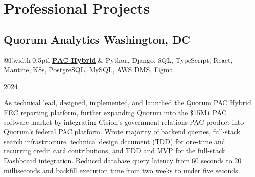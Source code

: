 \documentclass[]{article}
\newcommand\VRule{\color{lightgray}\vrule width 0.5pt}
\def\Plus{\texttt{+}}
\begin{document}


\section*{Professional Projects}
\subsection*{Quorum Analytics \hfill \textnormal{Washington, DC}}


\begin{tabular}{@{}l!{\VRule}l}
	{\bf \href{https://www.quorum.us/products/pac/}{PAC Hybrid}} & Python, Django, SQL, TypeScript, React, Mantine, K8s, PostgreSQL, MySQL, AWS DMS, Figma\\
\end{tabular}\hfill{\footnotesize 2024}

As technical lead, designed, implemented, and launched the Quorum PAC Hybrid FEC reporting platform, further expanding Quorum into the \$15M{\Plus} PAC software market by integrating Cision's government relations PAC product into Quorum's federal PAC platform. Wrote majority of backend queries, full-stack search infrastructure, technical design document (TDD) for one-time and recurring credit card contributions, and TDD and MVP for the full-stack Dashboard integration. Reduced database query latency from 60 seconds to 20 milliseconds and backfill execution time from two weeks to under five seconds.\\
\end{document}
